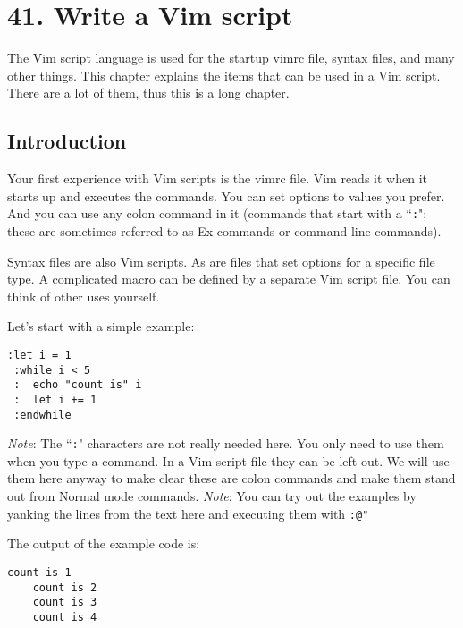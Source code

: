 \section{41. Write a Vim script}
\label{Write a Vim script}
The Vim script language is used for the startup vimrc file, syntax files, and many other things.
This chapter explains the items that can be used in a Vim script.
There are a lot of them, thus this is a long chapter.
\localtableofcontents
\subsection{Introduction}
\label{vim-script-intro}
\label{script}
Your first experience with Vim scripts is the vimrc file.
Vim reads it when it starts up and executes the commands.
You can set options to values you prefer.
And you can use any colon command in it (commands that start with a ``\texttt{:}"; these are sometimes referred to as Ex commands or command-line commands).

Syntax files are also Vim scripts.
As are files that set options for a specific file type.
A complicated macro can be defined by a separate Vim script file.
You can think of other uses yourself.

Let's start with a simple example:

\begin{Verbatim}[samepage=true]
 :let i = 1
 :while i < 5
 :  echo "count is" i
 :  let i += 1
 :endwhile
\end{Verbatim}

\emph{Note}: The ``\texttt{:}" characters are not really needed here.
You only need to use them when you type a command.
In a Vim script file they can be left out.
We will use them here anyway to make clear these are colon commands and make them stand out from Normal mode commands.
\emph{Note}: You can try out the examples by yanking the lines from the text here and executing them with \texttt{:@"}

The output of the example code is:

\begin{Verbatim}[samepage=true]
    count is 1
    count is 2
    count is 3
    count is 4
\end{Verbatim}

